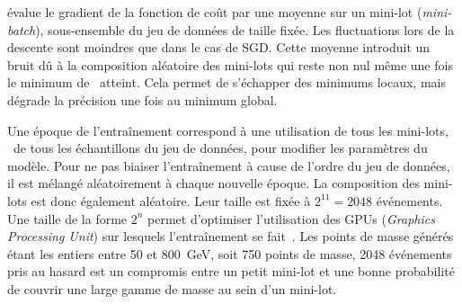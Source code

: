 évalue le gradient de la fonction de coût
par une moyenne
sur un \og mini-lot \fg{} (\emph{mini-batch}), sous-ensemble du jeu de données de taille fixée.
Les fluctuations lors de la descente sont moindres que dans le cas de SGD.
Cette moyenne introduit un bruit dû à la composition aléatoire des mini-lots
qui reste non nul même une fois le minimum de \Loss\ atteint.
Cela permet de s'échapper des minimums locaux, mais dégrade la précision une fois au minimum global.
\par
Une \og époque \fg{} de l'entraînement correspond à une utilisation de tous les mini-lots, \ie\ de tous les échantillons du jeu de données, pour modifier les paramètres du modèle.
Pour ne pas biaiser l'entraînement à cause de l'ordre du jeu de données,
il est mélangé aléatoirement à chaque nouvelle époque.
La composition des mini-lots est donc également aléatoire.
Leur taille est fixée à $2^{11}=\num{2048}$ événements.
Une taille de la forme $2^n$ permet d'optimiser l'utilisation des GPUs (\emph{Graphics Processing Unit}) sur lesquels l'entraînement se fait~\cite{DNN}.
Les points de masse générés étant les entiers entre \num{50} et \SI{800}{\GeV}, soit \num{750} points de masse,
\num{2048} événements pris au hasard est un compromis entre
un petit mini-lot
et
une bonne probabilité de couvrir une large gamme de masse au sein d'un mini-lot.